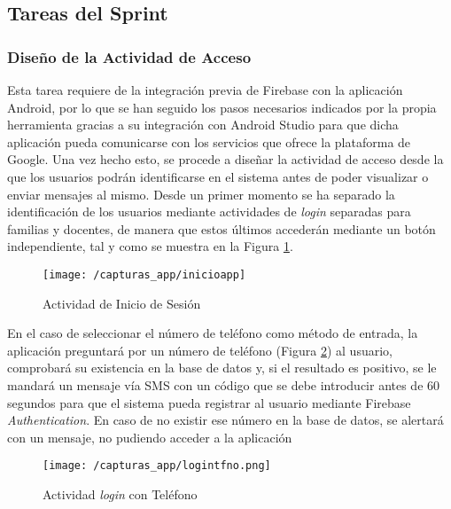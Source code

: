 \newpage

\subsection{Tareas del Sprint}
\subsubsection{Diseño de la Actividad de Acceso}
Esta tarea requiere de la integración previa de Firebase con la aplicación Android, por lo que se han seguido los pasos necesarios indicados por la propia herramienta gracias a su integración con Android Studio para que dicha aplicación pueda comunicarse con los servicios que ofrece la plataforma de Google. Una vez hecho esto, se procede a diseñar la actividad de acceso desde la que los usuarios podrán identificarse en el sistema antes de poder visualizar o enviar mensajes al mismo. Desde un primer momento se ha separado la identificación de los usuarios mediante actividades de \textit{login} separadas para familias y docentes, de manera que estos últimos accederán mediante un botón independiente, tal y como se muestra en la Figura \ref{fig:login1}.

\begin{figure}[!h]
	\begin{center}
		\texttt{[image: /capturas\_app/inicioapp]}
		\caption{Actividad de Inicio de Sesión}
		\label{fig:login1}
	\end{center}
\end{figure}

\newpage

En el caso de seleccionar el número de teléfono como método de entrada, la aplicación preguntará por un número de teléfono (Figura \ref{fig:logintfno}) al usuario, comprobará su existencia en la base de datos y, si el resultado es positivo, se le mandará un mensaje vía \acs{SMS} con un código que se debe introducir antes de 60 segundos para que el sistema pueda registrar al usuario mediante Firebase \textit{Authentication}. En caso de no existir ese número en la base de datos, se alertará con un mensaje, no pudiendo acceder a la aplicación

\begin{figure}[!h]
	\begin{center}
		\texttt{[image: /capturas\_app/logintfno.png]}
		\caption{Actividad \textit{login} con Teléfono}
		\label{fig:logintfno}
	\end{center}
\end{figure}

